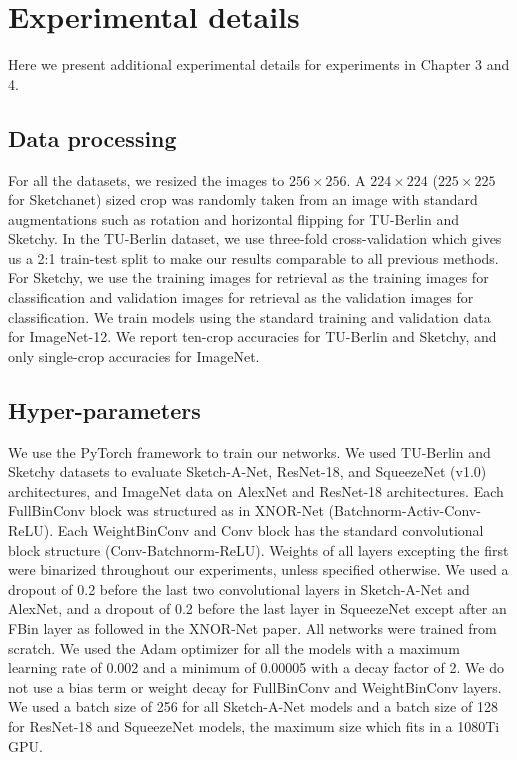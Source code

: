 \section{Experimental details}
Here we present additional experimental details for experiments in Chapter 3 and 4.
\subsection{Data processing} 
\noindent For all the datasets, we resized the images to $256\times 256$. A $224\times 224$ ($225\times 225$  for Sketchanet) sized crop was randomly taken from an image with standard augmentations such as rotation and horizontal flipping for TU-Berlin and Sketchy. In the TU-Berlin dataset, we use three-fold cross-validation which gives us a 2:1 train-test split to make our results comparable to all previous methods. For Sketchy, we use the training images for retrieval as the training images for classification and validation images for retrieval as the validation images for classification. We train models using the standard training and validation data for ImageNet-12. We report ten-crop accuracies for TU-Berlin and Sketchy, and only single-crop accuracies for ImageNet.

\subsection{Hyper-parameters} 
\noindent We use the PyTorch framework to train our networks. We used TU-Berlin and Sketchy datasets to evaluate Sketch-A-Net, ResNet-18, and SqueezeNet (v1.0) architectures, and ImageNet data on AlexNet and ResNet-18 architectures. Each FullBinConv block was structured as in XNOR-Net (Batchnorm-Activ-Conv-ReLU). Each WeightBinConv and Conv block has the standard convolutional block structure (Conv-Batchnorm-ReLU). Weights of all layers excepting the first were binarized throughout our experiments, unless specified otherwise. We used a dropout of 0.2 before the last two convolutional layers in Sketch-A-Net and AlexNet, and a dropout of 0.2 before the last layer in SqueezeNet except after an FBin layer as followed in the XNOR-Net paper. All networks were trained from scratch. We used the Adam optimizer for all the models with a maximum learning rate of 0.002 and a minimum of 0.00005 with a decay factor of 2.  We do not use a bias term or weight decay for FullBinConv and WeightBinConv layers. We used a batch size of 256 for all Sketch-A-Net models and a batch size of 128 for ResNet-18 and SqueezeNet models, the maximum size which fits in a 1080Ti GPU.\\

